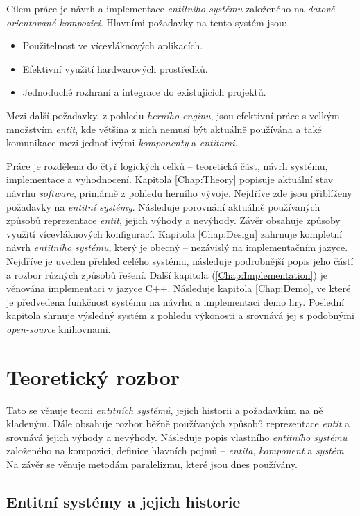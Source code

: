 Cílem práce je návrh a implementace \emph{entitního systému} založeného na \emph{datově orientované kompozici}. Hlavními požadavky na tento systém jsou: 
\begin{itemize}
	\item Použitelnost ve vícevláknových aplikacích.
	\item Efektivní využití hardwarových prostředků.
	\item Jednoduché rozhraní a integrace do existujících projektů.
\end{itemize}
Mezi další požadavky, z pohledu \emph{herního enginu}, jsou efektivní práce s velkým množstvím \emph{entit}, kde většina z nich nemusí být aktuálně používána a také komunikace mezi jednotlivými \emph{komponenty} a \emph{entitami}.

Práce je rozdělena do čtyř logických celků -- teoretická část, návrh systému, implementace a vyhodnocení. Kapitola \ref{Chap:Theory} popisuje aktuální stav návrhu \emph{software}, primárně z pohledu herního vývoje. Nejdříve zde jsou přiblíženy požadavky na \emph{entitní systémy}. Následuje porovnání aktuálně používaných způsobů reprezentace \emph{entit}, jejich výhody a nevýhody. Závěr obsahuje způsoby využití vícevláknových konfigurací. Kapitola \ref{Chap:Design} zahrnuje kompletní návrh \emph{entitního systému}, který je obecný -- nezávislý na implementačním jazyce. Nejdříve je uveden přehled celého systému, následuje podrobnější popis jeho částí a rozbor různých způsobů řešení. Další kapitola (\ref{Chap:Implementation}) je věnována implementaci v jazyce C++. Následuje kapitola \ref{Chap:Demo}, ve které je předvedena funkčnost systému na návrhu a implementaci demo hry. Poslední kapitola shrnuje výsledný systém z pohledu výkonosti a srovnává jej s podobnými \emph{open-source} knihovnami.

\chapter{Teoretický rozbor}

Tato se věnuje teorii \emph{entitních systémů}, jejich historii a požadavkům na ně kladeným. Dále obsahuje rozbor běžně používaných způsobů reprezentace \emph{entit} a srovnává jejich výhody a nevýhody. Následuje popis vlastního \emph{entitního systému} založeného na kompozici, definice hlavních pojmů -- \emph{entita}, \emph{komponent} a \emph{systém}. Na závěr se věnuje metodám paralelizmu, které jsou dnes používány.

\section{Entitní systémy a jejich historie}

